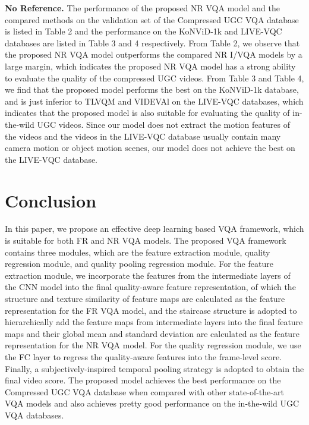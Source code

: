 \documentclass{article}
\begin{document}
\textbf{No Reference.}
The performance of the proposed NR VQA model and the compared methods on the validation set of the Compressed UGC VQA database is listed in Table 2 and the performance on the KoNViD-1k and LIVE-VQC databases are listed in Table 3 and 4 respectively. From Table 2, we observe that the proposed NR VQA model outperforms the compared NR I/VQA models by a large margin, which indicates the proposed NR VQA model has a strong ability to evaluate the quality of the compressed UGC videos.
From Table 3 and Table 4, we find that the proposed model performs the best on the KoNViD-1k database, and is just inferior to TLVQM and VIDEVAl on the LIVE-VQC databases, which indicates that the proposed model is also suitable for evaluating the quality of in-the-wild UGC videos. Since our model does not extract the motion features of the videos and the videos in the LIVE-VQC database usually contain many camera motion or object motion scenes, our model does not achieve the best on the LIVE-VQC database.




\section{Conclusion}
\vspace{-0.2cm}
In this paper, we propose an effective deep learning based VQA framework, which is suitable for both FR and NR VQA models. The proposed VQA framework contains three modules, which are the feature extraction module, quality regression module, and quality pooling regression module. For the feature extraction module, we incorporate the features from the intermediate layers of the CNN model into the final quality-aware feature representation, of which the structure and texture similarity of feature maps are calculated as the feature representation for the FR VQA model, and the staircase structure is adopted to hierarchically add the feature maps from intermediate layers into the final feature maps and their global mean and standard deviation are calculated as the feature representation for the NR VQA model. For the quality regression module, we use the FC layer to regress the quality-aware features into the frame-level score. Finally, a subjectively-inspired temporal pooling strategy is adopted to obtain the final video score. The proposed model achieves the best performance on the Compressed UGC VQA database when compared with other state-of-the-art VQA models and also achieves pretty good performance on the in-the-wild UGC VQA databases.




\vspace{-0.3cm}

\small


\end{document}
